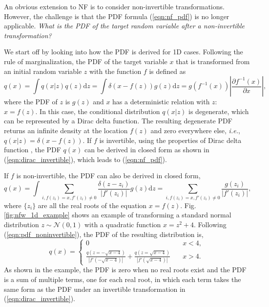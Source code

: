 \documentclass{article}
\newcommand{\diff}{\text{d}}
\newcommand{\ie}{\textit{i.e.}}
\begin{document}
An obvious extension to NF is to consider non-invertible transformations. However, the challenge is that the PDF formula (\ref{eqn:nf_pdf}) is no longer applicable. \textit{What is the PDF of the target random variable after a non-invertible transformation?}

We start off by looking into how the PDF is derived for 1D cases. Following the rule of marginalization, the PDF of the target variable $x$ that is transformed from an initial random variable $z$ with the function $f$ is defined as 
\begin{equation}
q(x) = \int q(x|z) q(z) \diff z = \int \delta\left(x - f(z)\right) g(z) \diff z = g(f^{-1}(x)) \left|\frac{\partial f^{-1}(x)}{\partial x}\right|, \label{eqn:dirac_invertible}
\end{equation}
where the PDF of $z$ is $g(z)$ and $x$ has a deterministic relation with $z$: $x=f(z)$. In this case, the conditional distribution $q(x|z)$ is degenerate, which can be represented by a Dirac delta function. The resulting degenerate PDF returns an infinite density at the location $f(z)$ and zero everywhere else, \ie, $q(x|z) = \delta\left(x - f(z)\right)$. If $f$ is invertible, using the properties of Dirac delta function \citep{Arfken1985}, the PDF $q(x)$ can be derived in closed form as shown in (\ref{eqn:dirac_invertible}), which leads to (\ref{eqn:nf_pdf}).

If $f$ is non-invertible, the PDF can also be derived in closed form,
\begin{equation}
q(x)  = \int \sum_{i, f(z_i)=x, f'(z_i)\neq0} \frac{\delta(z - z_i)}{|f'(z_i)|} g(z) \diff z = \sum_{i, f(z_i)=x, f'(z_i)\neq0} \frac{g(z_i)}{|f'(z_i)|}, \label{eqn:pdf_noninvertible}
\end{equation}
where $\{z_i\}$ are all the real roots of the equation $x=f(z)$. Fig.\,\ref{fig:nfw_1d_example} shows an example of transforming a standard normal distribution $z \sim \mathcal{N}(0,1)$ with a  quadratic function $x=z^2+4$. Following (\ref{eqn:pdf_noninvertible}), the PDF of the resulting distribution is, 
\begin{equation*}
q(x) =   
\begin{cases}
  0 & \quad x<4, \\
\frac{q(z=-\sqrt{x-4})}{|f'(-\sqrt{x-4})|}+\frac{q(z=\sqrt{x-4})}{|f'(\sqrt{x-4})|}  & \quad x>4.
\end{cases}
\end{equation*}
As shown in the example, the PDF is zero when no real roots exist and the PDF is a sum of multiple terms, one for each real root, in which each term takes the same form as the PDF under an invertible transformation in (\ref{eqn:dirac_invertible}).
\end{document}
